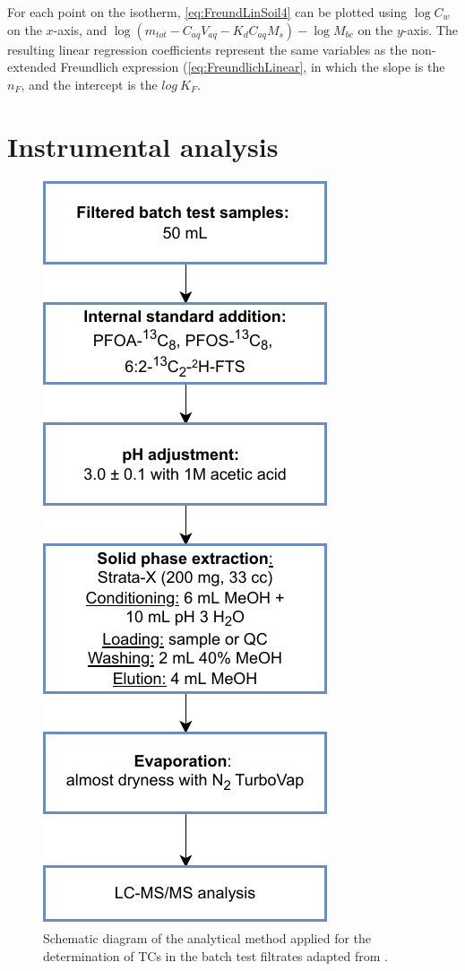 For each point on the isotherm, \cref{eq:FreundLinSoil4} can be plotted using $\log C_{w}$ on the $x$-axis, and $\log (m_{tot} - C_{aq}V_{aq} - K_dC_{aq}M_s) - \log M_{bc}$ on the $y$-axis. The resulting linear regression coefficients represent the same variables as the non-extended Freundlich expression (\cref{eq:FreundlichLinear}, in which the slope is the $n_F$, and the intercept is the $log~K_F$. 


\section{Instrumental analysis} \label{methods:instrAnalysis}

\begin{figure}
    \centering
    \includegraphics{Diagrams/Methods-Analytical_method.pdf}
    \caption{Schematic diagram of the analytical method applied for the determination of TCs in the batch test filtrates adapted from \cite{arvaniti2012diagram}.}
    \label{fig:analyticalMethod}
\end{figure}

